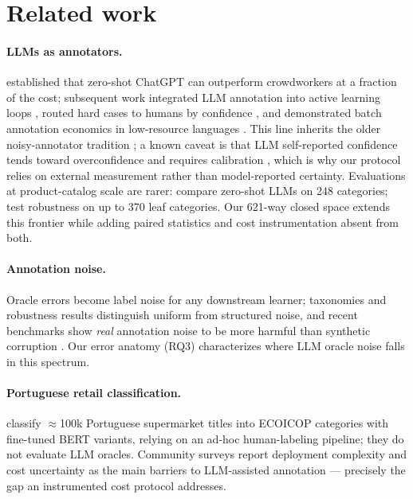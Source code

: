 \documentclass[11pt]{article}
\begin{document}
\section{Related work}
\label{sec:related}

\paragraph{LLMs as annotators.} \citet{Gilardi2023} established that
zero-shot ChatGPT can outperform crowdworkers at a fraction of the cost;
subsequent work integrated LLM annotation into active learning loops
\citep{Zhang2025}, routed hard cases to humans by confidence
\citep{Rouzegar2024}, and demonstrated batch annotation economics in
low-resource languages \citep{Kholodna2024}. This line inherits the older
noisy-annotator tradition \citep{Snow2008,Sheng2008}; a known caveat is
that LLM self-reported confidence tends toward overconfidence and requires
calibration \citep{Tian2023}, which is why our protocol relies on external
measurement rather than model-reported certainty. Evaluations at
product-catalog scale are rarer: \citet{Roumeliotis2025} compare zero-shot
LLMs on 248 categories; \citet{Gholamian2024} test robustness on up to 370
leaf categories. Our 621-way closed space extends this frontier while
adding paired statistics and cost instrumentation absent from both.

\paragraph{Annotation noise.} Oracle errors become label noise for any
downstream learner; taxonomies and robustness results
\citep{Frenay2014,Song2023NoisyLabels} distinguish uniform from structured
noise, and recent benchmarks show \emph{real} annotation noise to be more
harmful than synthetic corruption \citep{Merdjanovska2024NoiseBench,
Raczkowska2024AlleNoise}. Our error anatomy (RQ3) characterizes where LLM
oracle noise falls in this spectrum.

\paragraph{Portuguese retail classification.} \citet{Machado2026RetailPt}
classify $\approx$100k Portuguese supermarket titles into ECOICOP
categories with fine-tuned BERT variants, relying on an ad-hoc
human-labeling pipeline; they do not evaluate LLM oracles. Community
surveys report deployment complexity and cost uncertainty as the main
barriers to LLM-assisted annotation \citep{Romberg2025Reassessing} ---
precisely the gap an instrumented cost protocol addresses.
\end{document}
